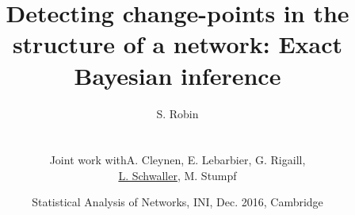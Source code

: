\documentclass[10pt]{beamer}
\newcommand{\fignet}{/home/robin/Bureau/RECHERCHE/RESEAUX/EXPOSES/FIGURES}
\begin{document}

\title[Detecting change-points in network structure]{Detecting change-points in the structure of a network: Exact Bayesian inference}

\author[S. Robin]{S. Robin \\ ~\\
  \begin{tabular}{ll}
    Joint work with & A. Cleynen, E. Lebarbier, G. Rigaill, \\
    & \underline{L. Schwaller}, M. Stumpf
  \end{tabular}
  }


\date[Dec. 2016, Cambridge]{Statistical Analysis of Networks, INI, Dec. 2016, Cambridge}

\maketitle

\end{document}
